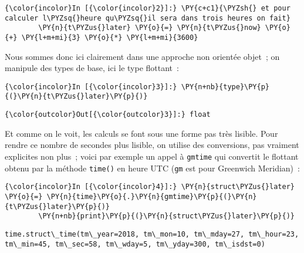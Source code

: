     \begin{Verbatim}[commandchars=\\\{\},frame=single,framerule=0.3mm,rulecolor=\color{cellframecolor}]
{\color{incolor}In [{\color{incolor}2}]:} \PY{c+c1}{\PYZsh{} et pour calculer l\PYZsq{}heure qu\PYZsq{}il sera dans trois heures on fait}
        \PY{n}{t\PYZus{}later} \PY{o}{=} \PY{n}{t\PYZus{}now} \PY{o}{+} \PY{l+m+mi}{3} \PY{o}{*} \PY{l+m+mi}{3600}
\end{Verbatim}


    Nous sommes donc ici clairement dans une approche non orientée objet~;
on manipule des types de base, ici le type flottant~:

    \begin{Verbatim}[commandchars=\\\{\},frame=single,framerule=0.3mm,rulecolor=\color{cellframecolor}]
{\color{incolor}In [{\color{incolor}3}]:} \PY{n+nb}{type}\PY{p}{(}\PY{n}{t\PYZus{}later}\PY{p}{)}
\end{Verbatim}


\begin{Verbatim}[commandchars=\\\{\},frame=single,framerule=0.3mm,rulecolor=\color{cellframecolor}]
{\color{outcolor}Out[{\color{outcolor}3}]:} float
\end{Verbatim}
            
    Et comme on le voit, les calculs se font sous une forme pas très
lisible. Pour rendre ce nombre de secondes plus lisible, on utilise des
conversions, pas vraiment explicites non plus~; voici par exemple un
appel à \texttt{gmtime} qui convertit le flottant obtenu par la méthode
\texttt{time()} en heure UTC (\texttt{gm} est pour Greenwich Meridian)~:

    \begin{Verbatim}[commandchars=\\\{\},frame=single,framerule=0.3mm,rulecolor=\color{cellframecolor}]
{\color{incolor}In [{\color{incolor}4}]:} \PY{n}{struct\PYZus{}later} \PY{o}{=} \PY{n}{time}\PY{o}{.}\PY{n}{gmtime}\PY{p}{(}\PY{n}{t\PYZus{}later}\PY{p}{)}
        \PY{n+nb}{print}\PY{p}{(}\PY{n}{struct\PYZus{}later}\PY{p}{)}
\end{Verbatim}


    \begin{Verbatim}[commandchars=\\\{\},frame=single,framerule=0.3mm,rulecolor=\color{cellframecolor}]
time.struct\_time(tm\_year=2018, tm\_mon=10, tm\_mday=27, tm\_hour=23, tm\_min=45, tm\_sec=58, tm\_wday=5, tm\_yday=300, tm\_isdst=0)
\end{Verbatim}

